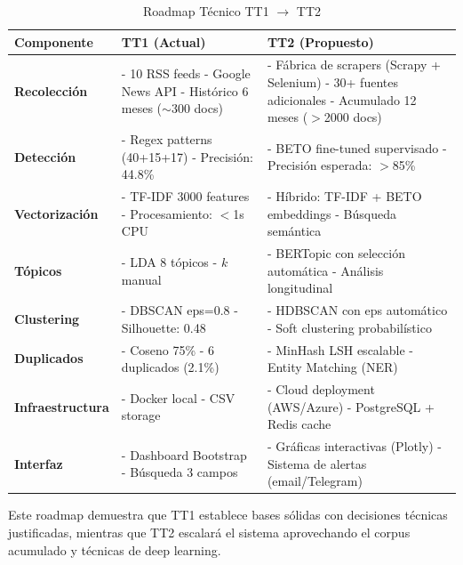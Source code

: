 \begin{table}[h]
\centering
\caption{Roadmap Técnico TT1 $\rightarrow$ TT2}
\label{tab:roadmap_tt2}
\begin{tabular}{|p{4cm}|p{5cm}|p{5cm}|}
\hline
\textbf{Componente} & \textbf{TT1 (Actual)} & \textbf{TT2 (Propuesto)} \\
\hline
\textbf{Recolección} & 
- 10 RSS feeds \newline
- Google News API \newline
- Histórico 6 meses \newline
($\sim$300 docs) & 
- Fábrica de scrapers (Scrapy + Selenium) \newline
- 30+ fuentes adicionales \newline
- Acumulado 12 meses ($>$2000 docs) \\
\hline
\textbf{Detección} & 
- Regex patterns (40+15+17) \newline
- Precisión: 44.8\% & 
- BETO fine-tuned supervisado \newline
- Precisión esperada: $>$85\% \\
\hline
\textbf{Vectorización} & 
- TF-IDF 3000 features \newline
- Procesamiento: $<$1s CPU & 
- Híbrido: TF-IDF + BETO embeddings \newline
- Búsqueda semántica \\
\hline
\textbf{Tópicos} & 
- LDA 8 tópicos \newline
- $k$ manual & 
- BERTopic con selección automática \newline
- Análisis longitudinal \\
\hline
\textbf{Clustering} & 
- DBSCAN eps=0.8 \newline
- Silhouette: 0.48 & 
- HDBSCAN con eps automático \newline
- Soft clustering probabilístico \\
\hline
\textbf{Duplicados} & 
- Coseno 75\% \newline
- 6 duplicados (2.1\%) & 
- MinHash LSH escalable \newline
- Entity Matching (NER) \\
\hline
\textbf{Infraestructura} & 
- Docker local \newline
- CSV storage & 
- Cloud deployment (AWS/Azure) \newline
- PostgreSQL + Redis cache \\
\hline
\textbf{Interfaz} & 
- Dashboard Bootstrap \newline
- Búsqueda 3 campos & 
- Gráficas interactivas (Plotly) \newline
- Sistema de alertas (email/Telegram) \\
\hline
\end{tabular}
\end{table}

Este roadmap demuestra que TT1 establece bases sólidas con decisiones técnicas justificadas, mientras que TT2 escalará el sistema aprovechando el corpus acumulado y técnicas de deep learning.